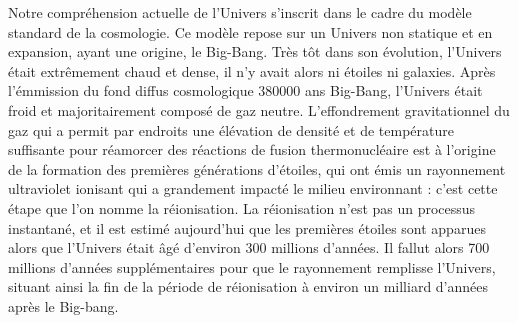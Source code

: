 Notre compréhension actuelle de l'Univers s'inscrit dans le cadre du modèle standard de la cosmologie.
Ce modèle repose sur un Univers non statique et en expansion, ayant une origine, le Big-Bang.
Très tôt dans son évolution, l'Univers était extrêmement chaud et dense, il n'y avait alors ni étoiles ni galaxies.
Après l'émmission du fond diffus cosmologique 380000 ans Big-Bang, l'Univers était froid et majoritairement composé de gaz neutre.
L'effondrement gravitationnel du gaz qui a permit par endroits une élévation de densité et de température suffisante pour réamorcer des réactions de fusion thermonucléaire est à l'origine de la formation des premières générations d'étoiles,
qui ont émis un rayonnement ultraviolet ionisant qui a grandement impacté le milieu environnant : c'est cette étape que l'on nomme la réionisation.%
La réionisation n'est pas un processus instantané, et il est estimé aujourd'hui que les premières étoiles sont apparues alors que l'Univers était âgé d'environ 300 millions d'années. 
Il fallut alors 700 millions d'années supplémentaires pour que le rayonnement remplisse l'Univers, situant ainsi la fin de la période de réionisation à environ un milliard d'années après le Big-bang.

